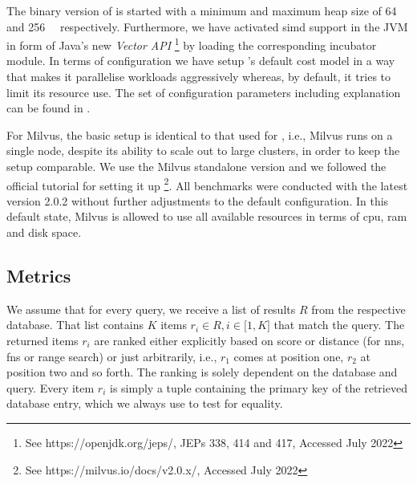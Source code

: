 The binary version of \cottontail{} is started with a minimum and maximum heap size of \SI{64}{\giga\byte} and \SI{256}{\giga\byte} respectively. Furthermore, we have activated \acrshort{simd} support in the JVM in form of Java's new \emph{Vector API} \footnote{See https://openjdk.org/jeps/, JEPs 338, 414 and 417, Accessed July 2022} by loading the corresponding incubator module. In terms of configuration we have setup \cottontail{}'s default cost model in a way that makes it parallelise workloads aggressively whereas, by default, it tries to limit its resource use. The set of configuration parameters including explanation can be found in .

For Milvus, the basic setup is identical to that used for \cottontail{}, i.e., Milvus runs on a single node, despite its ability to scale out to large clusters, in order to keep the setup comparable. We use the Milvus standalone version and we followed the official tutorial for setting it up \footnote{See https://milvus.io/docs/v2.0.x/, Accessed July 2022}. All benchmarks were conducted with the latest version 2.0.2 without further adjustments to the default configuration. In this default state, Milvus is allowed to use all available resources in terms of \acrshort{cpu}, \acrshort{ram} and disk space.

\subsection{Metrics}

We assume that for every query, we receive a list of results $R$ from the respective database. That list contains $K$ items $r_i \in R, i \in \lbrack 1, K  \rbrack $ that match the query. The returned items $r_i$ are ranked either explicitly based on score or distance (for \acrshort{nns}, \acrshort{fns} or range search) or just arbitrarily, i.e., $r_1$ comes at position one, $r_2$ at position two and so forth. The ranking is solely dependent on the database and query. Every item $r_i$ is simply a tuple containing the primary key of the retrieved database entry, which we always use to test for equality.


